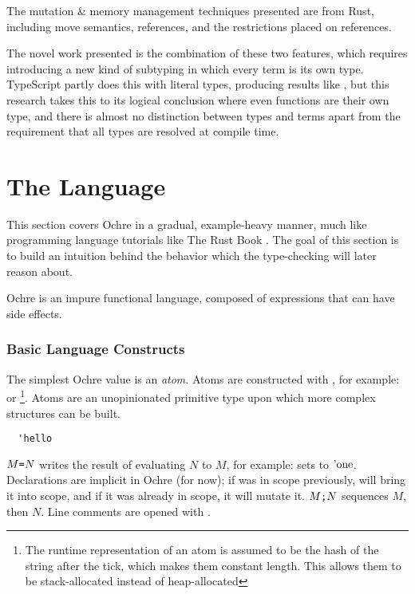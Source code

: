 \documentclass[12pt,twoside]{report}
\begin{document}
The mutation \& memory management techniques presented are from Rust, including move semantics, references, and the restrictions placed on references.

The novel work presented is the combination of these two features, which requires introducing a new kind of subtyping in which every term is its own type. TypeScript partly does this with literal types, producing results like , but this research takes this to its logical conclusion where even functions are their own type, and there is almost no distinction between types and terms apart from the requirement that all types are resolved at compile time.


\cleardoublepage
\section{The Language}
This section covers Ochre in a gradual, example-heavy manner, much like programming language tutorials like The Rust Book \citep{RustProgrammingLanguagea}. The goal of this section is to build an intuition behind the behavior which the type-checking will later reason about.

Ochre is an impure functional language, composed of expressions that can have side effects.

\subsubsection{Basic Language Constructs}
The simplest Ochre value is an \textit{atom}. Atoms are constructed with , for example:  or \footnote{The runtime representation of an atom is assumed to be the hash of the string after the tick, which makes them constant length. This allows them to be stack-allocated instead of heap-allocated}. Atoms are an unopinionated primitive type upon which more complex structures can be built.

\begin{verbatim}
  'hello
\end{verbatim}

$M \text{\texttt{=}} N$ writes the result of evaluating $N$ to $M$, for example:  sets  to $\text{'one}$. Declarations are implicit in Ochre (for now); if  was in scope previously,  will bring it into scope, and if it was already in scope, it will mutate it. $M \text{\texttt{;}} N$ sequences $M$, then $N$. Line comments are opened with \mono{//}.
\end{document}
